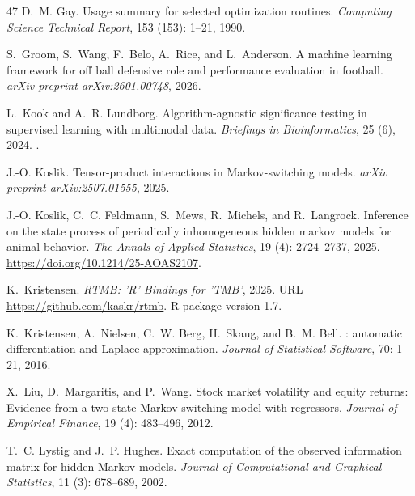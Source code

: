 \documentclass[namedate,webpdf,modern,medium]{oup-authoring-template}
\begin{document}
\begin{thebibliography}{47}
D.~M. Gay.
\newblock Usage summary for selected optimization routines.
\newblock \emph{Computing {S}cience {T}echnical {R}eport}, 153
  (153): 1--21, 1990.

S.~Groom, S.~Wang, F.~Belo, A.~Rice, and L.~Anderson.
\newblock A machine learning framework for off ball defensive role and
  performance evaluation in football.
\newblock \emph{arXiv preprint arXiv:2601.00748}, 2026.

L.~Kook and A.~R. Lundborg.
\newblock Algorithm-agnostic significance testing in supervised learning with
  multimodal data.
\newblock \emph{Briefings in Bioinformatics}, 25 (6), 2024.
\newblock {}.

J.-O. Koslik.
\newblock Tensor-product interactions in {M}arkov-switching models.
\newblock \emph{arXiv preprint arXiv:2507.01555}, 2025.

J.-O. Koslik, C.~C. Feldmann, S.~Mews, R.~Michels, and R.~Langrock.
\newblock Inference on the state process of periodically inhomogeneous hidden
  markov models for animal behavior.
\newblock \emph{The Annals of Applied Statistics}, 19 (4):
  2724--2737, 2025.
\newblock \url{https://doi.org/10.1214/25-AOAS2107}.

K.~Kristensen.
\newblock \emph{RTMB: 'R' Bindings for 'TMB'}, 2025.
\newblock URL \url{https://github.com/kaskr/rtmb}.
\newblock R package version 1.7.

K.~Kristensen, A.~Nielsen, C.~W. Berg, H.~Skaug, and B.~M. Bell.
: automatic differentiation and {L}aplace approximation.
\newblock \emph{Journal of Statistical Software}, 70: 1--21, 2016.

X.~Liu, D.~Margaritis, and P.~Wang.
\newblock Stock market volatility and equity returns: {E}vidence from a
  two-state {M}arkov-switching model with regressors.
\newblock \emph{Journal of {E}mpirical {F}inance}, 19 (4):
  483--496, 2012.

T.~C. Lystig and J.~P. Hughes.
\newblock Exact computation of the observed information matrix for hidden
  {M}arkov models.
\newblock \emph{Journal of {C}omputational and {G}raphical {S}tatistics},
  11 (3): 678--689, 2002.


\end{thebibliography}
\end{document}
